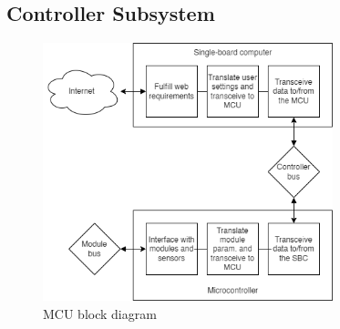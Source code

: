 \subsection{Controller Subsystem}
\label{sec:controller_subsystem}
\begin{figure}[H]
    \caption{MCU block diagram}
    \centering
    \includegraphics[width=0.75\textwidth]{images/mcu_block_diagram.png}
\end{figure}